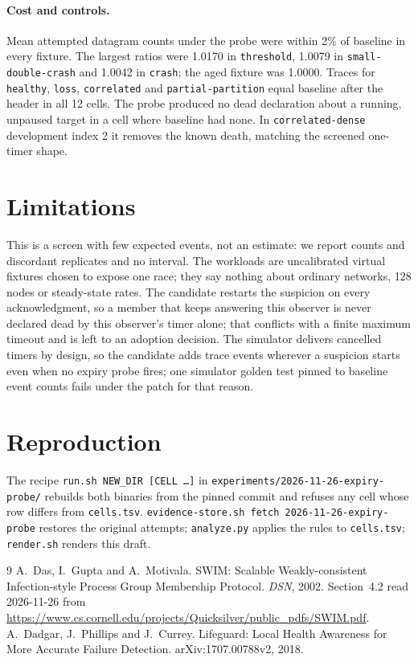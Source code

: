 \documentclass[10pt]{article}
\begin{document}
\paragraph{Cost and controls.}
Mean attempted datagram counts under the probe were within 2\% of
baseline in every fixture. The largest ratios were 1.0170 in
\texttt{threshold}, 1.0079 in \texttt{small-double-crash} and 1.0042 in
\texttt{crash}; the aged fixture was 1.0000. Traces for
\texttt{healthy}, \texttt{loss}, \texttt{correlated} and
\texttt{partial-partition} equal baseline after the header in all 12
cells. The probe produced no dead declaration about a running, unpaused
target in a cell where baseline had none. In \texttt{correlated-dense}
development index 2 it removes the known death, matching the screened
one-timer shape.

\section{Limitations}
This is a screen with few expected events, not an estimate: we report
counts and discordant replicates and no interval. The workloads are
uncalibrated virtual fixtures chosen to expose one race; they say nothing
about ordinary networks, 128 nodes or steady-state rates. The candidate
restarts the suspicion on every acknowledgment, so a member that keeps
answering this observer is never declared dead by this observer's timer
alone; that conflicts with a finite maximum timeout and is left to an
adoption decision. The simulator delivers cancelled timers by design, so
the candidate adds trace events wherever a suspicion starts even when no
expiry probe fires; one simulator golden test pinned to baseline event
counts fails under the patch for that reason.

\section{Reproduction}
The recipe \texttt{run.sh NEW\_DIR [CELL \ldots]} in
\texttt{experiments/2026-11-26-expiry-probe/} rebuilds both binaries from the pinned commit and refuses any cell whose
row differs from \texttt{cells.tsv}. \texttt{evidence-store.sh fetch
2026-11-26-expiry-probe} restores the original attempts;
\texttt{analyze.py} applies the rules to \texttt{cells.tsv};
\texttt{render.sh} renders this draft.

\begin{thebibliography}{9}
 A.~Das, I.~Gupta and A.~Motivala. SWIM: Scalable
Weakly-consistent Infection-style Process Group Membership Protocol.
\emph{DSN}, 2002. Section~4.2 read 2026-11-26 from
\url{https://www.cs.cornell.edu/projects/Quicksilver/public_pdfs/SWIM.pdf}.
 A.~Dadgar, J.~Phillips and J.~Currey. Lifeguard: Local
Health Awareness for More Accurate Failure Detection. arXiv:1707.00788v2,
2018.
\end{thebibliography}
\end{document}
